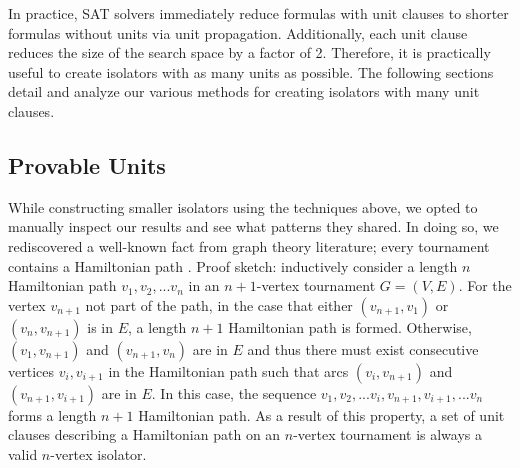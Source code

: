 \documentclass[conference]{IEEEtran}
\begin{document}
In practice, SAT solvers immediately reduce formulas with unit clauses to shorter formulas without units via unit propagation. Additionally, each unit clause reduces the size of the search space by a factor of 2. Therefore, it is practically useful to create isolators with as many units as possible. The following sections detail and analyze our various methods for creating isolators with many unit clauses.

\subsection{Provable Units}
While constructing smaller isolators using the techniques above, we opted to manually inspect our results and see what patterns they shared.  In doing so, we rediscovered a well-known fact from graph theory literature; every tournament contains a Hamiltonian path \cite{ref_tournament_book}. Proof sketch: inductively consider a length $n$ Hamiltonian path $v_1, v_2, ... v_n$ in an $n+1$-vertex tournament $G=(V,E)$. For the vertex $v_{n+1}$ not part of the path, in the case that either $(v_{n+1}, v_1)$ or $(v_n, v_{n+1})$ is in $E$, a length $n+1$ Hamiltonian path is formed. Otherwise, $(v_1, v_{n+1})$ and $(v_{n+1}, v_{n})$ are in $E$ and thus there must exist consecutive vertices $v_i,v_{i+1}$ in the Hamiltonian path such that arcs $(v_i,v_{n+1})$ and $(v_{n+1},v_{i+1})$ are in $E$. In this case, the sequence $v_1,v_2,...v_i, v_{n+1}, v_{i+1},...v_n$ forms a length $n+1$ Hamiltonian path. As a result of this property, a set of unit clauses describing a Hamiltonian path on an $n$-vertex tournament is always a valid $n$-vertex isolator.


\end{document}
